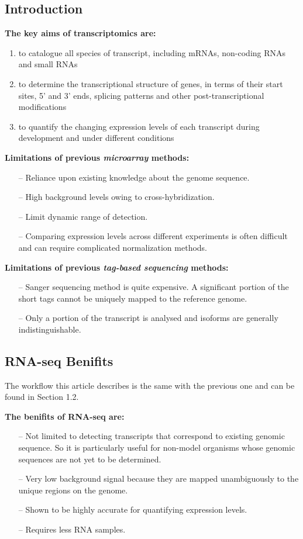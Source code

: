 \documentclass[a4paper,12pt]{article}
\begin{document}
\subsection{Introduction}
\textbf{The key aims of transcriptomics are:}
\begin{enumerate}
	\item to catalogue all species of transcript, including mRNAs, non-coding RNAs and small RNAs
	\item to determine the transcriptional structure of genes, in terms of their start sites, 5' and 3' ends, splicing patterns and other post-transcriptional modifications
	\item to quantify the changing expression levels of each transcript during development and under different conditions
\end{enumerate}

\textbf{Limitations of previous \emph{microarray} methods:}
\begin{itemize}
	\item [--]Reliance upon existing knowledge about the genome sequence.
	\item [--]High background levels owing to cross-hybridization.
	\item [--]Limit dynamic range of detection.
	\item [--]Comparing expression levels across different experiments is often difficult and can require complicated normalization methods.
\end{itemize}

\textbf{Limitations of previous \emph{tag-based sequencing} methods:}
\begin{itemize}
	\item [--] Sanger sequencing method is quite expensive. A significant portion of the short tags cannot be uniquely mapped to the reference genome.
	\item [--] Only a portion of the transcript is analysed and isoforms are generally indistinguishable.
\end{itemize}

\subsection{RNA-seq Benifits}
The workflow this article describes is the same with the previous one and can be found in Section 1.2. 

\vspace{5mm}
\textbf{The benifits of RNA-seq are:}
\begin{itemize}
	\item [--] Not limited to detecting transcripts that correspond to existing genomic sequence. So it is particularly useful for non-model organisms whose genomic sequences are not yet to be determined.
	\item [--] Very low background signal because they are mapped unambiguously to the unique regions on the genome.
	\item [--] Shown to be highly accurate for quantifying expression levels.
	\item [--] Requires less RNA samples.
\end{itemize}
\end{document}

